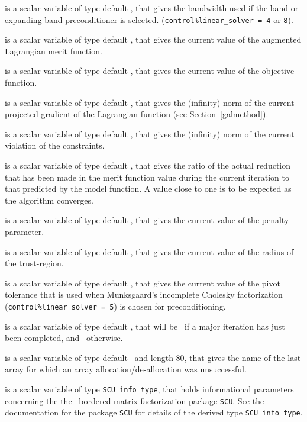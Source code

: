 \documentclass{galahad}
\begin{document}
\begin{description}
 is a scalar variable of type default \integer, that gives
the bandwidth used if the band
or expanding band preconditioner is selected.
({\tt control\%linear\_solver = 4} or {\tt 8}).

 is a scalar variable of type default \realdp, that gives
the current value of the augmented Lagrangian merit function.

 is a scalar variable of type default \realdp, that gives
the current value of the objective function.

 is a scalar variable of type default \realdp, that gives
the (infinity) norm of the current projected gradient of the Lagrangian
function (see Section~\ref{galmethod}).

 is a scalar variable of type default \realdp, that gives
the (infinity) norm of the current violation of the constraints.

 is a scalar variable of type default \realdp, that gives
the ratio of the actual reduction that has been made in the
merit function value during the current iteration to that
predicted by the model function.  A value close to one is to be expected
as the algorithm converges.

 is a scalar variable of type default \realdp, that gives
the current value of the penalty parameter.

 is a scalar variable of type default \realdp, that gives
the current value of the radius of the trust-region.

 is a scalar variable of type default \realdp, that gives
the current value of the pivot tolerance that is
used when Munksgaard's incomplete Cholesky factorization
({\tt control\%linear\_sol\-ver = 5}) is chosen for preconditioning.

 is a scalar variable of type default \logical, that will be
\true\ if a major iteration has just been completed, and \false\ otherwise.

 is a scalar variable of type
default \character\ and length 80, that gives
the name of the last array for which an array allocation/de-allocation
was unsuccessful.

 is a scalar variable of type {\tt SCU\_info\_type}, that holds
informational parameters concerning the
the \galahad\ bordered matrix factorization package {\tt SCU}.
See the documentation for the package {\tt SCU} for details of the
derived type {\tt SCU\_info\_type}.


\end{description}
\end{document}
